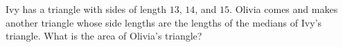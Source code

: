 Ivy has a triangle with sides of length $13$, $14$, and $15$. Olivia comes and makes another triangle whose side lengths are the lengths of the medians of Ivy's triangle. What is the area of Olivia's triangle?
